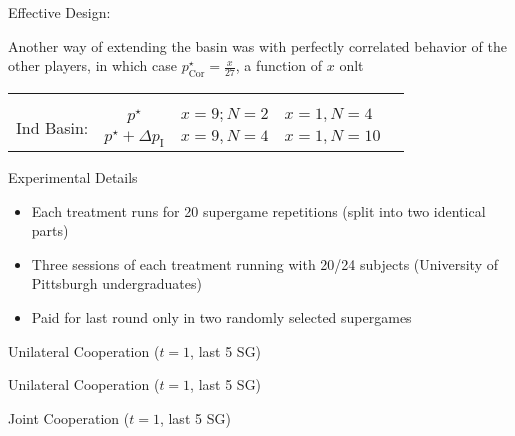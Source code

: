 \documentclass[english]{beamer}
\begin{document}
\begin{frame}{Effective Design:}
\begin{card}
    Another way of extending the basin was with perfectly correlated behavior of the other players, in which case $p^\star_{\text{Cor}}=\tfrac{x}{27}$, a function of $x$ onlt
\end{card}
\begin{card}
    \begin{center}%
        \begin{tabular}{cc|>{\centering}p{}|>{\centering}p{}|c}
         & \multicolumn{1}{c}{} & \multicolumn{2}{c}{Cor. Basin} & \\ 
         & \multicolumn{1}{c}{} & \multicolumn{1}{>{\centering}p{0.23\textwidth}}{$p^\star$} & \multicolumn{1}{>{\centering}p{0.23\textwidth}}{$p^\star-\Delta p_\text{C}$} & \\ 
        \cline{3-4} \cline{4-4} 
        \multirow{2}{*}{Ind Basin:} & $p^\star$ & $x=9;N=2$ & $x=1,N=4$ & \\ 
        \cline{3-4} \cline{4-4} 
         & \textrm{$p^\star+\Delta p_{\text{I}}$} & \textrm{$x=9,N=4$} & $x=1,N=10$ & \\ 
        \cline{3-4} \cline{4-4} 
        \end{tabular}
    \end{center}
\end{card}
\end{frame}
\begin{frame}
\begin{card}{Experimental Details}
    \begin{itemize}
        \item Each treatment runs for 20 supergame repetitions (split into two identical parts)
        \item Three sessions of each treatment running with 20/24 subjects (University
        of Pittsburgh undergraduates)
        \item Paid for last round only in two randomly selected supergames
    \end{itemize}
\end{card}
\end{frame}



\begin{frame}{Unilateral Cooperation ($t=1$, last 5 SG)}
\begin{center}\end{center}
\end{frame}
\begin{frame}{Unilateral Cooperation ($t=1$, last 5 SG)}
\begin{center}\end{center}
\end{frame}
\begin{frame}{Joint Cooperation ($t=1$, last 5 SG)}
\begin{center}\end{center}
\end{frame}
\end{document}
